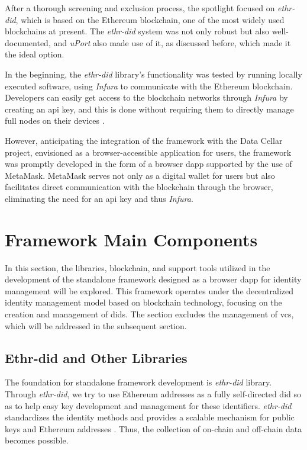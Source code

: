 After a thorough screening and exclusion process, the spotlight focused on \textit{ethr-did}, which is based on the Ethereum blockchain, one of the most widely used blockchains at 
present. The \textit{ethr-did} system was not only robust but also well-documented, and \textit{uPort} also made use of it, as discussed before, which made it the ideal option. 

In the beginning, the \textit{ethr-did} library's functionality was tested by running locally executed software, using \textit{Infura} to communicate with the Ethereum blockchain. 
Developers can easily get access to the blockchain networks through \textit{Infura} by creating an \gls{api} key, and this is done without requiring them to directly manage 
full nodes on their devices \cite{infura}.

However, anticipating the integration of the framework with the Data Cellar project, envisioned as a browser-accessible application for users, the framework was promptly developed 
in the form of a browser \gls{dapp} supported by the use of MetaMask. MetaMask serves not only as a digital wallet for users but also facilitates direct communication with the 
blockchain through the browser, eliminating the need for an \gls{api} key and thus \textit{Infura}.

\section{Framework Main Components}

In this section, the libraries, blockchain, and support tools utilized in the development of the standalone framework designed as a browser \gls{dapp} for 
identity management will be explored. This framework operates under the decentralized identity management model based on blockchain technology, focusing on the creation and 
management of \gls{did}s. The section excludes the management of \gls{vc}s, which will be addressed in the subsequent section.

\subsection{Ethr-did and Other Libraries}

The foundation for standalone framework development is \textit{ethr-did} library. Through \textit{ethr-did}, we try to use Ethereum addresses as a fully self-directed \gls{did} 
so as to help easy key development and management for these identifiers. \textit{ethr-did} standardizes the identity methods and provides a scalable mechanism for 
public keys and Ethereum addresses \cite{ethr-did}. Thus, the collection of on-chain and off-chain data becomes possible. 

